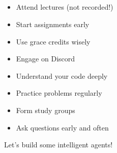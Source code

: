 \documentclass[mathserif, handout]{beamer}
\begin{document}
\begin{frame}
\begin{center}
\Large {}
\end{center}
\vspace{0.5cm}
\begin{center}
\\

\vspace{0.5cm}

\\

\vspace{0.5cm}

\\
\\

\end{center}
\end{frame}

\begin{frame}
\begin{center}
\Large {}
\end{center}
\vspace{1cm}

\begin{itemize}
    \item Attend lectures (not recorded!)
    \item Start assignments early
    \item Use grace credits wisely
    \item Engage on Discord
    \item Understand your code deeply
    \item Practice problems regularly
    \item Form study groups
    \item Ask questions early and often
\end{itemize}

\end{frame}

\begin{frame}
\begin{center}
\vspace{2cm}
\Large {}

\vspace{1cm}

\large Let's build some intelligent agents!

\vspace{1cm}

\\
\\
\end{center}
\end{frame}
\end{document}
